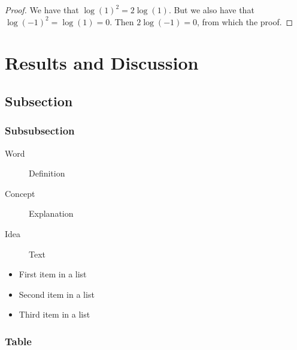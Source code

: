 \documentclass[
10pt, %
a4paper, %
oneside, %
headinclude,footinclude, %
BCOR5mm, %
]{scrartcl}
\begin{document}
\begin{proof} 
We have that $\log(1)^2 = 2\log(1)$.
But we also have that $\log(-1)^2=\log(1)=0$.
Then $2\log(-1)=0$, from which the proof.
\end{proof}


\section{Results and Discussion}

\lipsum[10] %


\subsection{Subsection}

\lipsum[11] %

\subsubsection{Subsubsection}

\lipsum[12] %

\begin{description}
\item[Word] Definition
\item[Concept] Explanation
\item[Idea] Text
\end{description}

\lipsum[12] %

\begin{itemize}[noitemsep] %
\item First item in a list
\item Second item in a list
\item Third item in a list
\end{itemize}

\subsubsection{Table}

\lipsum[13] %
\end{document}
